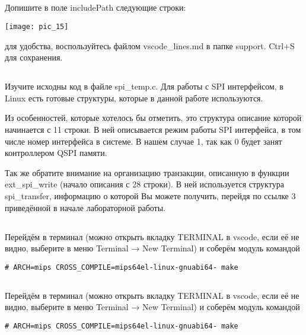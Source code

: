 \subsection{}Допишите в поле includePath следующие строки:\\
\begin{center}
	\texttt{[image: pic\_15]}
\end{center}
для удобства, воспользуйтесь файлом vscode\_lines.md в папке support. Ctrl+S для сохранения.

\subsection{}Изучите исходны код в файле spi\_temp.c. Для работы с SPI интерфейсом, в Linux есть готовые структуры, которые в данной работе используются. 

Из особенностей, которые хотелось бы отметить, это структура описание которой начинается с 11 строки. В ней описывается режим работы SPI интерфейса, в том числе номер интерфейса в системе. В нашем случае 1, так как 0 будет занят контроллером QSPI памяти.

Так же обратите внимание на организацию транзакции, описанную в функции  ext\_spi\_write (начало описания с 28 строки). В ней используется структура spi\_transfer, информацию о которой Вы можете получить, перейдя по ссылке 3 приведённой в начале лабораторной работы.

\subsection{}Перейдём в терминал (можно открыть вкладку TERMINAL в vscode, если её не видно, выберите в меню Terminal → New Terminal) и соберём модуль командой
\begin{lstlisting}[style=bash]
# ARCH=mips CROSS_COMPILE=mips64el-linux-gnuabi64- make 
\end{lstlisting}

\subsection{}Перейдём в терминал (можно открыть вкладку TERMINAL в vscode, если её не видно, выберите в меню Terminal → New Terminal) и соберём модуль командой
\begin{lstlisting}[style=bash]
	# ARCH=mips CROSS_COMPILE=mips64el-linux-gnuabi64- make 
\end{lstlisting}

